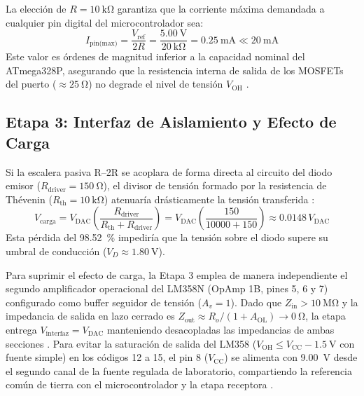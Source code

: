 \documentclass[journal,transmag]{IEEEtran}
\begin{document}
La elección de $R = \SI{10}{\kilo\ohm}$ garantiza que la corriente máxima demandada a cualquier pin digital del microcontrolador sea:
\begin{equation}
I_{\text{pin(max)}} = \frac{V_{\text{ref}}}{2R} = \frac{\SI{5.00}{\volt}}{\SI{20}{\kilo\ohm}} = \SI{0.25}{\milli\ampere} \ll \SI{20}{\milli\ampere}
\label{eq:ipin}
\end{equation}
Este valor es órdenes de magnitud inferior a la capacidad nominal del ATmega328P, asegurando que la resistencia interna de salida de los MOSFETs del puerto ($\approx \SI{25}{\ohm}$) no degrade el nivel de tensión $V_{\text{OH}}$ \cite{sedra2020}.

\subsection{Etapa 3: Interfaz de Aislamiento y Efecto de Carga}
Si la escalera pasiva R--2R se acoplara de forma directa al circuito del diodo emisor ($R_{\text{driver}} = \SI{150}{\ohm}$), el divisor de tensión formado por la resistencia de Thévenin ($R_{\text{th}} = \SI{10}{\kilo\ohm}$) atenuaría drásticamente la tensión transferida \cite{alexander2018}:
\begin{equation}
V_{\text{carga}} = V_{\text{DAC}}\left(\frac{R_{\text{driver}}}{R_{\text{th}} + R_{\text{driver}}}\right) = V_{\text{DAC}}\left(\frac{150}{10000 + 150}\right) \approx 0.0148\,V_{\text{DAC}}
\label{eq:carga}
\end{equation}
Esta pérdida del \SI{98.52}{\percent} impediría que la tensión sobre el diodo supere su umbral de conducción ($V_D \approx \SI{1.80}{\volt}$).

Para suprimir el efecto de carga, la Etapa 3 emplea de manera independiente el segundo amplificador operacional del LM358N (OpAmp 1B, pines 5, 6 y 7) configurado como buffer seguidor de tensión ($A_v = 1$). Dado que $Z_{\text{in}} > \SI{10}{\mega\ohm}$ y la impedancia de salida en lazo cerrado es $Z_{\text{out}} \approx R_o/(1 + A_{\text{OL}}) \to \SI{0}{\ohm}$, la etapa entrega $V_{\text{interfaz}} = V_{\text{DAC}}$ manteniendo desacopladas las impedancias de ambas secciones \cite{franco2015,ti_lm358}. Para evitar la saturación de salida del LM358 ($V_{\text{OH}} \le V_{\text{CC}} - \SI{1.5}{\volt}$ con fuente simple) en los códigos 12 a 15, el pin 8 ($V_{\text{CC}}$) se alimenta con \SI{+9.00}{\volt} desde el segundo canal de la fuente regulada de laboratorio, compartiendo la referencia común de tierra con el microcontrolador y la etapa receptora \cite{ti_lm358}.
\end{document}

